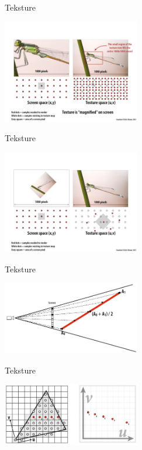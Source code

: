 \documentclass[9pt]{beamer}
\begin{document}
\begin{frame}{Teksture}
	\begin{center}
		\includegraphics[width=6cm]{./slike/slide_052.jpg}
	\end{center}
\end{frame}

\begin{frame}{Teksture}
	\begin{center}
		\includegraphics[width=6cm]{./slike/slide_053.jpg}
	\end{center}
\end{frame}

\begin{frame}{Teksture}
	\begin{center}
		\includegraphics[width=6cm]{./slike/slide_030.jpg}
	\end{center}
\end{frame}

\begin{frame}{Teksture}
	\begin{center}
		\includegraphics[width=6cm]{./slike/slide_054.jpg}
	\end{center}
\end{frame}
\end{document}
